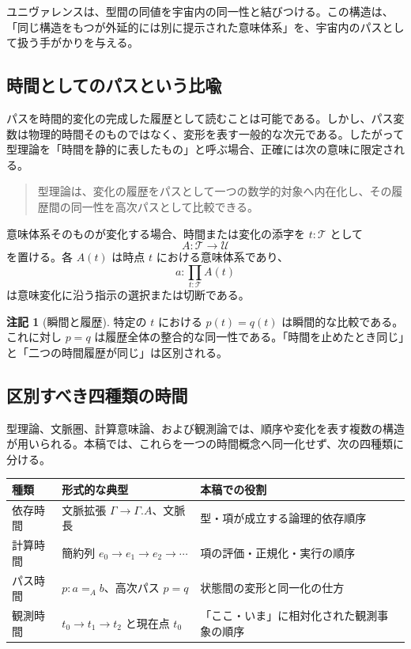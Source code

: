 \documentclass[a4paper,11pt]{ltjsarticle}
\theoremstyle{definition}
\newtheorem{remark}[definition]{注記}
\theoremstyle{plain}
\newcommand{\Time}{\mathcal T}
\begin{document}
ユニヴァレンスは、型間の同値を宇宙内の同一性と結びつける。この構造は、「同じ構造をもつが外延的には別に提示された意味体系」を、宇宙内のパスとして扱う手がかりを与える。

\subsection{時間としてのパスという比喩}

パスを時間的変化の完成した履歴として読むことは可能である。しかし、パス変数は物理的時間そのものではなく、変形を表す一般的な次元である。したがって型理論を「時間を静的に表したもの」と呼ぶ場合、正確には次の意味に限定される。
\begin{quote}
型理論は、変化の履歴をパスとして一つの数学的対象へ内在化し、その履歴間の同一性を高次パスとして比較できる。
\end{quote}

意味体系そのものが変化する場合、時間または変化の添字を $t:\Time$ として
\begin{equation}
 A:\Time\longrightarrow\mathcal U
\end{equation}
を置ける。各 $A(t)$ は時点 $t$ における意味体系であり、
\begin{equation}
 a:\prod_{t:\Time}A(t)
\end{equation}
は意味変化に沿う指示の選択または切断である。

\begin{remark}[瞬間と履歴]
特定の $t$ における $p(t)=q(t)$ は瞬間的な比較である。これに対し $p=q$ は履歴全体の整合的な同一性である。「時間を止めたとき同じ」と「二つの時間履歴が同じ」は区別される。
\end{remark}

\subsection{区別すべき四種類の時間}

型理論、文脈圏、計算意味論、および観測論では、順序や変化を表す複数の構造が用いられる。本稿では、これらを一つの時間概念へ同一化せず、次の四種類に分ける。

\begin{center}
\begin{tabular}{p{} p{} p{}}
\toprule
種類 & 形式的な典型 & 本稿での役割 \\
\midrule
依存時間 & 文脈拡張 $\Gamma\to\Gamma.A$、文脈長 & 型・項が成立する論理的依存順序 \\
計算時間 & 簡約列 $e_0\to e_1\to e_2\to\cdots$ & 項の評価・正規化・実行の順序 \\
パス時間 & $p:a=_A b$、高次パス $p=q$ & 状態間の変形と同一化の仕方 \\
観測時間 & $t_0\to t_1\to t_2$ と現在点 $t_0$ & 「ここ・いま」に相対化された観測事象の順序 \\
\bottomrule
\end{tabular}
\end{center}
\end{document}
